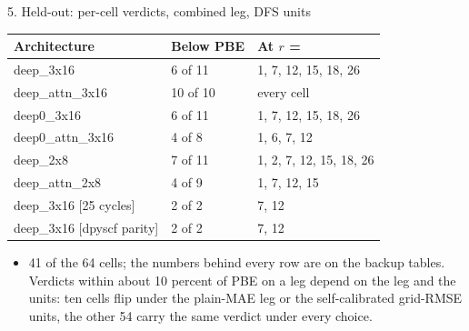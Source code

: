 \begin{frame}[label=f34]{5. Held-out: per-cell verdicts, combined leg, DFS units}
  \begin{center}\small
  \begin{tabular}{lll}
  \toprule
  Architecture & Below PBE & At $r$ = \\ \midrule
  deep\_3x16 & 6 of 11 & 1, 7, 12, 15, 18, 26 \\
  deep\_attn\_3x16 & 10 of 10 & every cell \\
  deep0\_3x16 & 6 of 11 & 1, 7, 12, 15, 18, 26 \\
  deep0\_attn\_3x16 & 4 of 8 & 1, 6, 7, 12 \\
  deep\_2x8 & 7 of 11 & 1, 2, 7, 12, 15, 18, 26 \\
  deep\_attn\_2x8 & 4 of 9 & 1, 7, 12, 15 \\
  deep\_3x16 [25 cycles] & 2 of 2 & 7, 12 \\
  deep\_3x16 [dpyscf parity] & 2 of 2 & 7, 12 \\
  \bottomrule
  \end{tabular}
  \end{center}
  \small
  \begin{itemize}
    \item 41 of the 64 cells; the numbers behind every row are on the backup tables. Verdicts within about 10 percent of PBE on a leg depend on the leg and the units: ten cells flip under the plain-MAE leg or the self-calibrated grid-RMSE units, the other 54 carry the same verdict under every choice.
  \end{itemize}
  \hfill \hyperlink{b6}{} \hyperlink{b7}{} \hyperlink{b8}{}
\end{frame}
